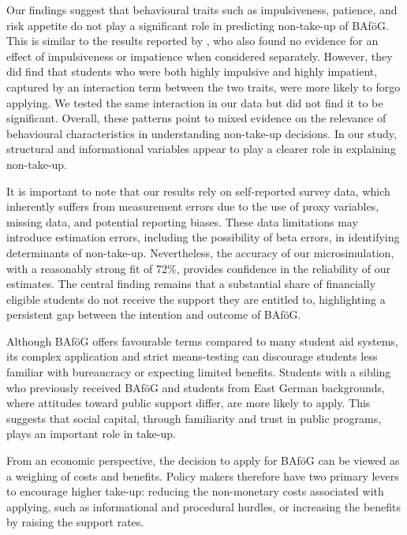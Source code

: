 Our findings suggest that behavioural traits such as impulsiveness, patience, and risk appetite do not play a significant role in predicting non-take-up of BAföG. This is similar to the results reported by \cite{herber_non-take-up_2019}, who also found no evidence for an effect of impulsiveness or impatience when considered separately. However, they did find that students who were both highly impulsive and highly impatient, captured by an interaction term between the two traits, were more likely to forgo applying. We tested the same interaction in our data but did not find it to be significant. Overall, these patterns point to mixed evidence on the relevance of behavioural characteristics in understanding non-take-up decisions. In our study, structural and informational variables appear to play a clearer role in explaining non-take-up.

It is important to note that our results rely on self-reported survey data, which inherently suffers from measurement errors due to the use of proxy variables, missing data, and potential reporting biases. 
These data limitations may introduce estimation errors, including the possibility of beta errors, in identifying determinants of non-take-up. 
Nevertheless, the accuracy of our microsimulation, with a reasonably strong fit of 72\%, provides confidence in the reliability of our estimates. 
The central finding remains that a substantial share of financially eligible students do not receive the support they are entitled to, highlighting a persistent gap between the intention and outcome of BAföG.

Although BAföG offers favourable terms compared to many student aid systems, its complex application and strict means-testing can discourage students less familiar with bureaucracy or expecting limited benefits.
Students with a sibling who previously received BAföG and students from East German backgrounds, where attitudes toward public support differ, are more likely to apply.
This suggests that social capital, through familiarity and trust in public programs, plays an important role in take-up.

From an economic perspective, the decision to apply for BAföG can be viewed as a weighing of costs and benefits. 
Policy makers therefore have two primary levers to encourage higher take-up: reducing the non-monetary costs associated with applying, such as informational and procedural hurdles, or increasing the benefits by raising the support rates. 

